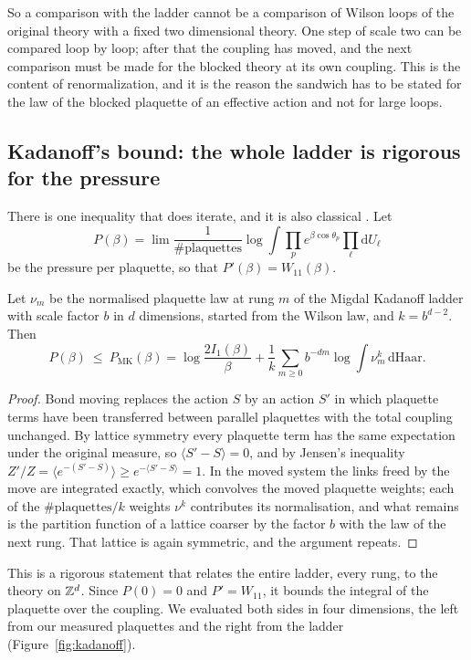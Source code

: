 So a comparison with the ladder cannot be a comparison of Wilson loops of the original theory with a fixed two dimensional theory. One step of scale two can be compared loop by loop; after that the coupling has moved, and the next comparison must be made for the blocked theory at its own coupling. This is the content of renormalization, and it is the reason the sandwich has to be stated for the law of the blocked plaquette of an effective action and not for large loops.

\subsection{Kadanoff's bound: the whole ladder is rigorous for the pressure}

There is one inequality that does iterate, and it is also classical \cite{Ka75,Ka76}. Let
\[
P(\beta)=\lim\frac{1}{\#\text{plaquettes}}\log\int\prod_pe^{\beta\cos\theta_p}\prod_\ell\mathrm dU_\ell
\]
be the pressure per plaquette, so that $P'(\beta)=W_{11}(\beta)$.

\begin{theorem}[Kadanoff]\label{thm:kadanoff}
Let $\nu_m$ be the normalised plaquette law at rung $m$ of the Migdal Kadanoff ladder with scale factor $b$ in $d$ dimensions, started from the Wilson law, and $k=b^{d-2}$. Then
\[
P(\beta)\ \le\ P_{\mathrm{MK}}(\beta)=\log\frac{2I_1(\beta)}{\beta}+\frac1k\sum_{m\ge0}b^{-dm}\log\int\nu_m^k\,\mathrm d\mathrm{Haar}.
\]
\end{theorem}

\begin{proof}
Bond moving replaces the action $S$ by an action $S'$ in which plaquette terms have been transferred between parallel plaquettes with the total coupling unchanged. By lattice symmetry every plaquette term has the same expectation under the original measure, so $\langle S'-S\rangle=0$, and by Jensen's inequality $Z'/Z=\langle e^{-(S'-S)}\rangle\ge e^{-\langle S'-S\rangle}=1$. In the moved system the links freed by the move are integrated exactly, which convolves the moved plaquette weights; each of the $\#\text{plaquettes}/k$ weights $\nu^k$ contributes its normalisation, and what remains is the partition function of a lattice coarser by the factor $b$ with the law of the next rung. That lattice is again symmetric, and the argument repeats.
\end{proof}

This is a rigorous statement that relates the entire ladder, every rung, to the theory on $\mathbb{Z}^d$. Since $P(0)=0$ and $P'=W_{11}$, it bounds the integral of the plaquette over the coupling. We evaluated both sides in four dimensions, the left from our measured plaquettes and the right from the ladder (Figure~\ref{fig:kadanoff}).

